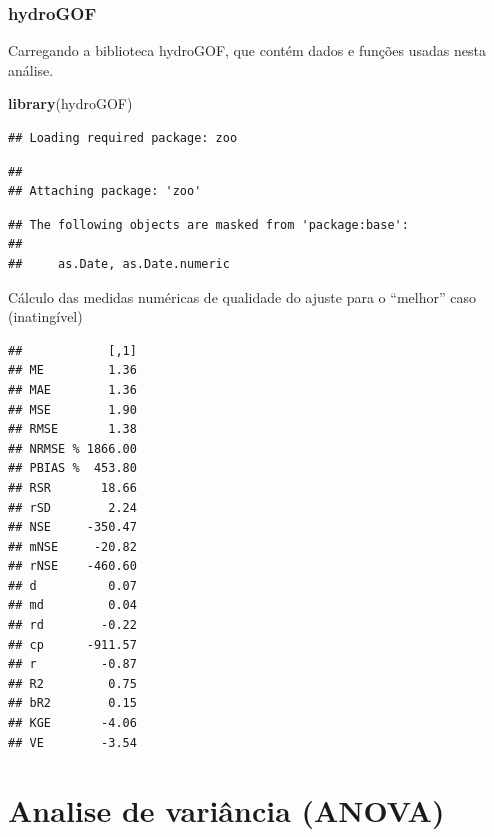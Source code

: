 \documentclass[
]{book}
\newenvironment{Shaded}{\begin{snugshade}}{\end{snugshade}}
\newcommand{\DataTypeTok}[1]{\textcolor[rgb]{0.13,0.29,0.53}{#1}}
\newcommand{\KeywordTok}[1]{\textcolor[rgb]{0.13,0.29,0.53}{\textbf{#1}}}
\newcommand{\NormalTok}[1]{#1}
\newcommand{\OperatorTok}[1]{\textcolor[rgb]{0.81,0.36,0.00}{\textbf{#1}}}
\begin{document}
\hypertarget{hydrogof}{%
\subsection{hydroGOF}\label{hydrogof}}

Carregando a biblioteca hydroGOF, que contém dados e funções usadas nesta análise.

\begin{Shaded}
\begin{Highlighting}[]
\KeywordTok{library}\NormalTok{(hydroGOF)}
\end{Highlighting}
\end{Shaded}

\begin{verbatim}
## Loading required package: zoo
\end{verbatim}

\begin{verbatim}
## 
## Attaching package: 'zoo'
\end{verbatim}

\begin{verbatim}
## The following objects are masked from 'package:base':
## 
##     as.Date, as.Date.numeric
\end{verbatim}

Cálculo das medidas numéricas de qualidade do ajuste para o ``melhor'' caso (inatingível)

\begin{Shaded}
\end{Shaded}

\begin{verbatim}
##            [,1]
## ME         1.36
## MAE        1.36
## MSE        1.90
## RMSE       1.38
## NRMSE % 1866.00
## PBIAS %  453.80
## RSR       18.66
## rSD        2.24
## NSE     -350.47
## mNSE     -20.82
## rNSE    -460.60
## d          0.07
## md         0.04
## rd        -0.22
## cp      -911.57
## r         -0.87
## R2         0.75
## bR2        0.15
## KGE       -4.06
## VE        -3.54
\end{verbatim}

\hypertarget{analise-de-variuxe2ncia-anova}{%
\chapter{Analise de variância (ANOVA)}\label{analise-de-variuxe2ncia-anova}}
\end{document}
